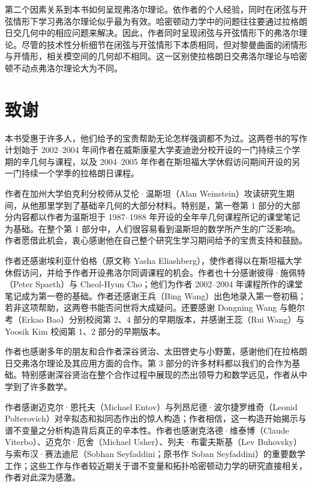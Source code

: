 第二个因素关系到本书如何呈现弗洛尔理论。依作者的个人经验，同时在闭弦与开弦情形下学习弗洛尔理论似乎最为有效。哈密顿动力学中的问题往往要通过拉格朗日交几何中的相应问题来解决。因此，作者同时呈现闭弦与开弦情形下的弗洛尔理论。尽管\termPseudoholomorphicCurve{}的技术性分析细节在闭弦与开弦情形下本质相同，但对黎曼曲面的闭情形与开情形，相关\termPseudoholomorphicCurve{}模空间的几何却不相同。这一区别使拉格朗日交弗洛尔理论与哈密顿不动点弗洛尔理论大为不同。

\section*{致谢}

本书受惠于许多人，他们给予的宝贵帮助无论怎样强调都不为过。这两卷书的写作计划始于 2002--2004 年间作者在威斯康星大学麦迪逊分校开设的一门持续三个学期的辛几何与\termPseudoholomorphicCurve{}课程，以及 2004--2005 年作者在斯坦福大学休假访问期间开设的另一门持续一个学季的拉格朗日\termFloerHomology{}课程。

作者在加州大学伯克利分校师从艾伦·温斯坦（Alan Weinstein）攻读研究生期间，从他那里学到了基础辛几何的大部分材料。特别是，第一卷第 1 部分的大部分内容都以作者为温斯坦于 1987--1988 年开设的全年辛几何课程所记的课堂笔记为基础。在整个第 1 部分中，人们很容易看到温斯坦的数学所产生的广泛影响。作者愿借此机会，衷心感谢他在自己整个研究生学习期间给予的宝贵支持和鼓励。

作者还感谢埃利亚什伯格（原文称 Yasha Eliashberg），使作者得以在斯坦福大学休假访问，并给予作者开设弗洛尔同调课程的机会。作者也十分感谢彼得·施佩特（Peter Spaeth）与 Cheol-Hyun Cho；他们为作者 2002--2004 年课程所作的课堂笔记成为第一卷的基础。作者还感谢王兵（Bing Wang）出色地录入第一卷初稿；若非这项帮助，这两卷书能否问世将大成疑问。还要感谢 Dongning Wang 与鲍尔考（Erkao Bao）分别校阅第 2、4 部分的早期版本，并感谢王蕊（Rui Wang）与 Yoosik Kim 校阅第 1、2 部分的早期版本。

作者也感谢多年的朋友和合作者深谷贤治、太田啓史与小野薫，感谢他们在拉格朗日交弗洛尔理论及其应用方面的合作。第 3 部分的许多材料都以我们的合作为基础。特别感谢深谷贤治在整个合作过程中展现的杰出领导力和数学远见，作者从中学到了许多数学。

作者感谢迈克尔·恩托夫（Michael Entov）与列昂尼德·波尔捷罗维奇（Leonid Polterovich）对辛拟态和拟同态作出的惊人构造；作者相信，这一构造开始揭示\termFloerHomology{}与谱不变量之分析构造背后真正的辛本性。作者也感谢克洛德·维泰博（Claude Viterbo）、迈克尔·厄舍（Michael Usher）、列夫·布霍夫斯基（Lev Buhovsky）与索布汉·赛法迪尼（Sobhan Seyfaddini；原书作 Soban Seyfaddini）的重要数学工作；这些工作与作者较近期关于谱不变量和拓扑哈密顿动力学的研究直接相关，作者对此深为感激。

